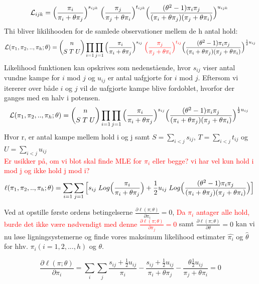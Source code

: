 \documentclass[11pt,a4paper]{article}
\begin{document}
$$
\mathcal{L}_{ijk}=\Big{(}\frac{\pi_i}{\pi_i+\theta\pi_j}\Big{)}^{s_{ijk}}
\;\Big{(}\frac{\pi_j}{\pi_j+\theta\pi_i}\Big{)}^{t_{ijk}}
\Big{(}\frac{(\theta^2-1)\pi_i \pi_j}{(\pi_i+\theta\pi_j)(\pi_j+\theta\pi_i)}\Big{)}^{u_{ijk}}
\;
$$
Thi bliver likilihooden for de samlede observationer mellem de h antal hold:
$$
\mathcal{L}(\pi_1,\pi_2,..,\pi_h;\theta)=\binom{n}{S\;T\;U}\prod_{i=1}\prod_{j=1}\Big{(}\frac{\pi_i}{\pi_i+\theta\pi_j}\Big{)}^{s_{ij}}
\;\textcolor{red}{\Big{(}\frac{\pi_j}{\pi_j+\theta\pi_i}\Big{)}^{t_{ij}}}
\Big{(}\frac{(\theta^2-1)\pi_i \pi_j}{(\pi_i+\theta\pi_j)(\pi_j+\theta\pi_i)}\Big{)}^{\frac{1}{2}u_{ij}}
$$
Likelihood funktionen kan opskrives som nedenstående, hvor $s_{ij}$ viser antal vundne kampe for $i$ mod $j$ og $u_{ij}$ er antal uafgjorte for $i$ mod $j$. Eftersom vi itererer over både $i$ og $j$ vil de uafgjorte kampe blive fordoblet, hvorfor der ganges med en halv i potensen. 
$$
\mathcal{L}(\pi_1,\pi_2,..,\pi_h;\theta)=\binom{n}{S\;T\;U}\prod_{i=1}\prod_{j=1}\Big{(}\frac{\pi_i}{\pi_i+\theta\pi_j}\Big{)}^{s_{ij}}
\Big{(}\frac{(\theta^2-1)\pi_i \pi_j}{(\pi_i+\theta\pi_j)(\pi_j+\theta\pi_i)}\Big{)}^{\frac{1}{2}u_{ij}}
\;
$$
Hvor r, er antal kampe mellem hold i og j samt $S=\sum_{i<j}s_{ij}$,  $T=\sum_{i<j}t_{ij}$ og $U=\sum_{i<j}u_{ij}$
\\
\textcolor{red}{Er usikker på, om vi blot skal finde MLE for $\pi_i$ eller begge? vi har vel kun hold i mod j og ikke hold j mod i?}
\\
$$
\ell(\pi_1,\pi_2,..,\pi_h;\theta)=\sum_{i=1}\sum_{j=1}\Big{[}s_{ij}\;Log\Big{(}\frac{\pi_i}{\pi_i+\theta\pi_j}\Big{)}+
\frac{1}{2}u_{ij}\;Log\Big{(}\frac{(\theta^2-1)\pi_i \pi_j}{(\pi_i+\theta\pi_j)(\pi_j+\theta\pi_i)}\Big{)}\Big{]}
\;
$$

Ved at opstille første ordens betingelserne $\frac{\partial \ell(\pi;\theta)}{\partial \pi_i}=0$, 
\textcolor{red}{Da $\pi_i$ antager alle hold, burde det ikke være nødvendigt med denne
$\frac{\partial \ell(\pi;\theta)}{\partial \pi_j}=0$} samt $\frac{\partial \ell(\pi;\theta)}{\partial \theta}=0$ kan vi nu løse ligningsystemerne og finde vores maksimum likelihood estimater $\hat{\pi_i}$ og $\hat{\theta}$ for hhv. $\pi_i(i=1,2,...,h)$ og $\theta$. 

\begin{equation}
\frac{\partial \ell(\pi;\theta)}{\partial \pi_i}=\sum_i\sum_j \frac{s_{ij}+\frac{1}{2}u_{ij}}{\pi_i}-\frac{s_{ij}+\frac{1}{2}u_{ij}}{\pi_i+\theta\pi_j}-\frac{\theta\frac{1}{2}u_{ij}}{\pi_j+\theta\pi_i}=0
\end{equation}
\end{document}
